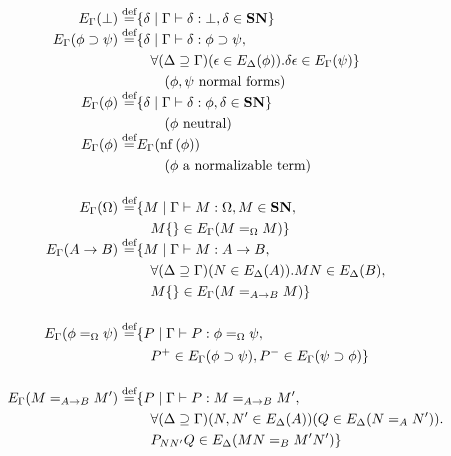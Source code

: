 \begin{definition}
\label{df:computable}
\begin{align*}
E_\Gamma(\bot) \mathrel{\smash{\stackrel{\text{def}}{=}}} & \{ \delta \mid \Gamma \vdash \delta : \bot, \delta \in \mathbf{SN} \} \\
E_\Gamma(\phi \supset \psi) \mathrel{\smash{\stackrel{\text{def}}{=}}} & \{ \delta \mid \Gamma \vdash \delta : \phi \supset \psi, \\
& \quad \forall (\Delta \supseteq \Gamma)(\epsilon \in E_\Delta(\phi)). \delta \epsilon \in E_\Gamma(\psi) \} \\
& \quad \quad (\phi , \psi \text{ normal forms}) \\
E_\Gamma(\phi) \mathrel{\smash{\stackrel{\text{def}}{=}}} & \{ \delta \mid \Gamma \vdash \delta : \phi, \delta \in \mathbf{SN} \} \\
& \qquad (\phi \text{ neutral}) \\
E_\Gamma(\phi) \mathrel{\smash{\stackrel{\text{def}}{=}}} & E_\Gamma(\mathrm{nf} \left( {\phi} \right)) \\
& \qquad (\phi \text{ a normalizable term}) \\
\\
E_\Gamma(\Omega) \mathrel{\smash{\stackrel{\text{def}}{=}}} & \{ M \mid \Gamma \vdash M : \Omega, M \in \mathbf{SN}, \\
& \quad M \{\} \in E_\Gamma(M =_\Omega M) \} \\
E_\Gamma(A \rightarrow B) \mathrel{\smash{\stackrel{\text{def}}{=}}} & \{ M \mid \Gamma \vdash M : A \rightarrow B, \\
& \quad \forall (\Delta \supseteq \Gamma) (N \in E_\Delta(A)). MN \in E_\Delta(B), \\
& \quad M \{\} \in E_\Gamma(M =_{A \rightarrow B} M) \} \\
\\
E_\Gamma(\phi =_\Omega \psi) \mathrel{\smash{\stackrel{\text{def}}{=}}} & \{ P \mid \Gamma \vdash P : \phi =_\Omega \psi, \\
& \quad P^+ \in E_\Gamma(\phi \supset \psi), P^- \in E_\Gamma(\psi \supset \phi) \} \\
\\
E_\Gamma(M =_{A \rightarrow B} M') \mathrel{\smash{\stackrel{\text{def}}{=}}} & \{ P \mid \Gamma \vdash P : M =_{A \rightarrow B} M', \\
& \quad \forall (\Delta \supseteq \Gamma) (N, N' \in E_\Delta(A)) (Q \in E_\Delta(N =_A N')). \\
& \quad P_{NN'}Q \in E_\Delta(MN =_B M'N') \}
\end{align*}
\end{definition}

